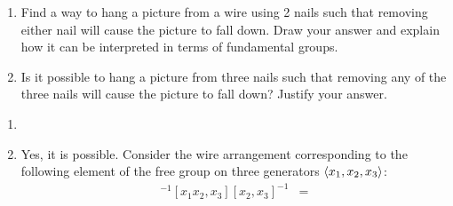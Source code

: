 \documentclass[twoside,10pt]{article}
\begin{document}

\begin{exer}[1]
\begin{enumerate}
	\item Find a way to hang a picture from a wire using 2 nails such that removing either nail will cause the picture to fall down. Draw your answer and explain how it can be interpreted in terms of fundamental groups.
	\item Is it possible to hang a picture from three nails such that removing any of the three nails will cause the picture to fall down? Justify your answer.
\end{enumerate}
\end{exer}

\begin{enumerate}
	\item {}

	\item Yes, it is possible. Consider the wire arrangement corresponding to the following element of the free group on three generators $\langle x_1, x_2, x_3 \rangle$:
		\begin{align*}
			[x_1,x_3]^{-1} [x_1x_2,x_3] [x_2,x_3]^{-1} &= 
		\end{align*}
\end{enumerate}

\newpage
\end{document}
